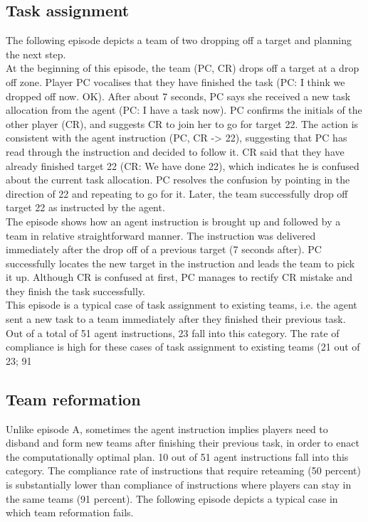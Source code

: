 \subsection{Task assignment}
The following episode depicts a team of two dropping off a target and planning the next step.\\

At the beginning of this episode, the team (PC, CR) drops off a target at a drop off zone. Player PC vocalises that they have finished the task (PC: I think we dropped off now. OK).  After about 7 seconds, PC says she received a new task allocation from the agent (PC: I have a task now). PC confirms the initials of the other player (CR), and suggests CR to join her to go for target 22. The action is consistent with the agent instruction (PC, CR -> 22), suggesting that PC has read through the instruction and decided to follow it. CR said that they have already finished target 22 (CR: We have done 22), which indicates he is confused about the current task allocation. PC resolves the confusion by pointing in the direction of 22 and repeating to go for it. Later, the team successfully drop off target 22 as instructed by the agent.\\

The episode shows how an agent instruction is brought up and followed by a team in relative straightforward manner. The instruction was delivered immediately after the drop off of a previous target (7 seconds after). PC successfully locates the new target in the instruction and leads the team to pick it up. Although CR is confused at first, PC manages to rectify CR mistake and they finish the task successfully. \\

This episode is a typical case of task assignment to existing teams, i.e. the agent sent a new task to a team immediately after they finished their previous task. Out of a total of 51 agent instructions, 23 fall into this category. The rate of compliance is high for these cases of task assignment to existing teams (21 out of 23; 91%

\subsection{Team reformation}
Unlike episode A, sometimes the agent instruction implies players need to disband and form new teams after finishing their previous task, in order to enact the computationally optimal plan. 10 out of 51 agent instructions fall into this category. The compliance rate of instructions that require reteaming (50 percent) is substantially lower than compliance of instructions where players can stay in the same teams (91 percent). The following episode depicts a typical case in which team reformation fails.\\


